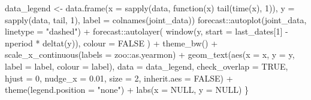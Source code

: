 \documentclass[
]{article}
\newenvironment{Shaded}{\begin{snugshade}}{\end{snugshade}}
\newcommand{\AttributeTok}[1]{\textcolor[rgb]{0.40,0.45,0.13}{#1}}
\newcommand{\ConstantTok}[1]{\textcolor[rgb]{0.56,0.35,0.01}{#1}}
\newcommand{\ControlFlowTok}[1]{\textcolor[rgb]{0.00,0.23,0.31}{#1}}
\newcommand{\DecValTok}[1]{\textcolor[rgb]{0.68,0.00,0.00}{#1}}
\newcommand{\FloatTok}[1]{\textcolor[rgb]{0.68,0.00,0.00}{#1}}
\newcommand{\FunctionTok}[1]{\textcolor[rgb]{0.28,0.35,0.67}{#1}}
\newcommand{\NormalTok}[1]{\textcolor[rgb]{0.00,0.23,0.31}{#1}}
\newcommand{\OtherTok}[1]{\textcolor[rgb]{0.00,0.23,0.31}{#1}}
\newcommand{\SpecialCharTok}[1]{\textcolor[rgb]{0.37,0.37,0.37}{#1}}
\newcommand{\StringTok}[1]{\textcolor[rgb]{0.13,0.47,0.30}{#1}}
\newcommand\1{\mathds{1}}
\begin{document}
\begin{Shaded}
\begin{Highlighting}[]
\NormalTok{  data\_legend }\OtherTok{\textless{}{-}}
    \FunctionTok{data.frame}\NormalTok{(}\AttributeTok{x =} \FunctionTok{sapply}\NormalTok{(data, }\ControlFlowTok{function}\NormalTok{(x) }\FunctionTok{tail}\NormalTok{(}\FunctionTok{time}\NormalTok{(x), }\DecValTok{1}\NormalTok{)),}
               \AttributeTok{y =} \FunctionTok{sapply}\NormalTok{(data, tail, }\DecValTok{1}\NormalTok{),}
               \AttributeTok{label =} \FunctionTok{colnames}\NormalTok{(joint\_data))}
\NormalTok{  forecast}\SpecialCharTok{::}\FunctionTok{autoplot}\NormalTok{(joint\_data, }\AttributeTok{linetype =} \StringTok{"dashed"}\NormalTok{) }\SpecialCharTok{+}
\NormalTok{    forecast}\SpecialCharTok{::}\FunctionTok{autolayer}\NormalTok{(}
      \FunctionTok{window}\NormalTok{(y, }\AttributeTok{start =}\NormalTok{ last\_dates[}\DecValTok{1}\NormalTok{] }\SpecialCharTok{{-}}\NormalTok{ nperiod }\SpecialCharTok{*} \FunctionTok{deltat}\NormalTok{(y)),}
      \AttributeTok{colour =} \ConstantTok{FALSE}
\NormalTok{    ) }\SpecialCharTok{+}
    \FunctionTok{theme\_bw}\NormalTok{() }\SpecialCharTok{+}
    \FunctionTok{scale\_x\_continuous}\NormalTok{(}\AttributeTok{labels =}\NormalTok{ zoo}\SpecialCharTok{::}\NormalTok{as.yearmon) }\SpecialCharTok{+}
    \FunctionTok{geom\_text}\NormalTok{(}\FunctionTok{aes}\NormalTok{(}\AttributeTok{x =}\NormalTok{ x, }\AttributeTok{y =}\NormalTok{ y, }\AttributeTok{label =}\NormalTok{ label, }\AttributeTok{colour =}\NormalTok{ label),}
              \AttributeTok{data =}\NormalTok{ data\_legend,}
              \AttributeTok{check\_overlap =} \ConstantTok{TRUE}\NormalTok{, }\AttributeTok{hjust =} \DecValTok{0}\NormalTok{, }\AttributeTok{nudge\_x =} \FloatTok{0.01}\NormalTok{,}
              \AttributeTok{size =} \DecValTok{2}\NormalTok{, }\AttributeTok{inherit.aes =} \ConstantTok{FALSE}\NormalTok{) }\SpecialCharTok{+}
    \FunctionTok{theme}\NormalTok{(}\AttributeTok{legend.position =} \StringTok{"none"}\NormalTok{) }\SpecialCharTok{+}
    \FunctionTok{labs}\NormalTok{(}\AttributeTok{x =} \ConstantTok{NULL}\NormalTok{, }\AttributeTok{y =} \ConstantTok{NULL}\NormalTok{)}
\NormalTok{\}}


\end{Highlighting}
\end{Shaded}
\end{document}
